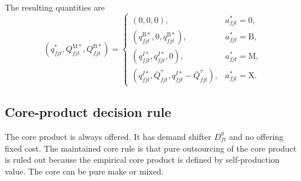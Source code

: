 \documentclass[11pt,a4paper]{article}
\newcommand{\M}{\mathrm{M}}
\newcommand{\B}{\mathrm{B}}
\newcommand{\X}{\mathrm{X}}
\begin{document}
The resulting quantities are
\begin{equation}
    (q^*_{fjt},Q^{\M *}_{fjt},Q^{\B *}_{fjt})=
    \begin{cases}
        (0,0,0), & a^*_{fjt}=0,\\
        (q^{\B *}_{fjt},0,q^{\B *}_{fjt}), & a^*_{fjt}=\B,\\
        (q^{I *}_{fjt},q^{I *}_{fjt},0), & a^*_{fjt}=\M,\\
        (q^{I *}_{fjt},\bar Q^{\tau}_{fjt},q^{I *}_{fjt}-\bar Q^{\tau}_{fjt}), & a^*_{fjt}=\X.
    \end{cases}
    \label{eq:quantities_by_action}
\end{equation}

\subsection{Core-product decision rule}

The core product is always offered. It has demand shifter $D^0_{ft}$ and no offering fixed cost. The maintained core rule is that pure outsourcing of the core product is ruled out because the empirical core product is defined by self-production value. The core can be pure make or mixed.
\end{document}
